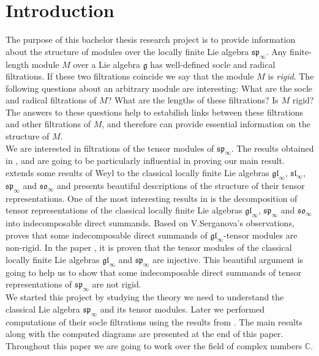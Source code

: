 
\section{Introduction}
\label{section:Introduction}
The purpose of this bachelor thesis research project is to provide information about the structure of modules over the locally finite Lie algebra $\mathfrak{sp}_{\infty}$.
Any finite-length module $M$ over a Lie algebra $\mathfrak{g}$ has well-defined socle and radical filtrations.
If these two filtrations coincide we say that the module $M$ is \textit{rigid}. 
The following questions about an arbitrary module are interesting: What are the socle and radical filtrations of $M$? What are the lengths of these filtrations? Is $M$ rigid? The answers to these questions help to estabilish links between these filtrations and other filtrations of $M$, and therefore can provide essential information on the structure of $M$.
\\We are interested in filtrations of the tensor modules of $\mathfrak{sp}_{\infty}$.
The results obtained in \cite{styrk}, \cite{weiss} and \cite{cohen} are going to be particularly influential in proving our main result. \cite{styrk} extends some results of Weyl to the classical locally finite Lie algebras $\mathfrak{gl}_{\infty}$, $\mathfrak{sl}_{\infty}$, $\mathfrak{sp}_{\infty}$ and $\mathfrak{so}_{\infty}$ and presents beautiful descriptions of the structure of their tensor representations. One of the most interesting results in \cite{styrk} is the decomposition of tensor representations of the classical locally finite Lie algebras $\mathfrak{gl}_{\infty}$, $\mathfrak{sp}_{\infty}$ and $\mathfrak{so}_{\infty}$ into indecomposable direct summands. Based on V.Serganova's observations, \cite{weiss} proves that some indecomposable direct summands of $\mathfrak{gl}_{\infty}$-tensor modules are non-rigid. In the paper \cite{styrk}, it is proven that the tensor modules of the classical locally finite Lie algebras $\mathfrak{gl}_{\infty}$ and $\mathfrak{sp}_{\infty}$ are injective. This beautiful argument is going to help us to show that some indecomposable direct summands of tensor representations of $\mathfrak{sp}_{\infty}$ are not rigid.
\\We started this project by studying the theory we need to understand the classical Lie algebra $\mathfrak{sp}_{\infty}$ and its tensor modules. Later we performed computations of their socle filtrations using the results from \cite{styrk}. The main results along with the computed diagrams are presented at the end of this paper.
\\Throughout this paper we are going to work over the field of complex numbers $\mathbb{C}$.
